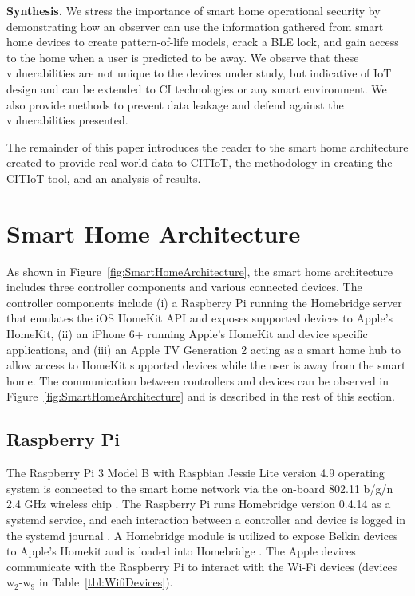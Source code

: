 \documentclass[12pt,letterpaper,oneside]{book}
\begin{document}
\textbf{Synthesis.} We stress the importance of smart home operational security by demonstrating how an observer can use the information gathered from smart home devices to create pattern-of-life models, crack a \ac{BLE} lock, and gain access to the home when a user is predicted to be away. We observe that these vulnerabilities are not unique to the devices under study, but indicative of \ac{IoT} design and can be extended to \ac{CI} technologies or any smart environment. We also provide methods to prevent data leakage and defend against the vulnerabilities presented.

The remainder of this paper introduces the reader to the smart home architecture created to provide real-world data to \ac{CITIoT}, the methodology in creating the \ac{CITIoT} tool, and an analysis of results.

\section{Smart Home Architecture}
As shown in Figure~\ref{fig:SmartHomeArchitecture}, the smart home architecture includes three controller components and various connected devices. The controller components include (i) a Raspberry Pi running the Homebridge server that emulates the iOS HomeKit API and exposes supported devices to Apple's HomeKit, (ii) an iPhone 6+ running Apple's HomeKit and device specific applications, and (iii) an Apple TV Generation 2 acting as a smart home hub to allow access to HomeKit supported devices while the user is away from the smart home. The communication between controllers and devices can be observed in Figure~\ref{fig:SmartHomeArchitecture} and is described in the rest of this section.

\figSmartHomeArchitecture

\subsection{Raspberry Pi}

The Raspberry Pi 3 Model B with Raspbian Jessie Lite version 4.9 operating system is connected to the smart home network via the on-board 802.11 b/g/n 2.4 GHz wireless chip \cite{rasbperry}. The Raspberry Pi runs Homebridge version 0.4.14 as a systemd service, and each interaction between a controller and device is logged in the systemd journal \cite{homebridge}. A Homebridge module is utilized to expose Belkin devices to Apple's Homekit and is loaded into Homebridge \cite{wemo}. The Apple devices communicate with the Raspberry Pi to interact with the Wi-Fi devices (devices w$ _2 $-w$ _9 $ in Table~\ref{tbl:WifiDevices}).
\end{document}

